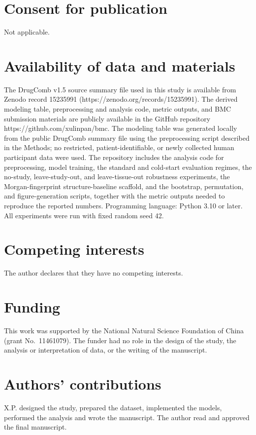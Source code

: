 \documentclass[11pt]{article}
\begin{document}
\section*{Consent for publication}
Not applicable.

\section*{Availability of data and materials}
The DrugComb v1.5 source summary file used in this study is available from Zenodo record 15235991 (https://zenodo.org/records/15235991). The derived modeling table, preprocessing and analysis code, metric outputs, and BMC submission materials are publicly available in the GitHub repository https://github.com/xulinpan/bmc. The modeling table was generated locally from the public DrugComb summary file using the preprocessing script described in the Methods; no restricted, patient-identifiable, or newly collected human participant data were used. The repository includes the analysis code for preprocessing, model training, the standard and cold-start evaluation regimes, the no-study, leave-study-out, and leave-tissue-out robustness experiments, the Morgan-fingerprint structure-baseline scaffold, and the bootstrap, permutation, and figure-generation scripts, together with the metric outputs needed to reproduce the reported numbers. Programming language: Python 3.10 or later. All experiments were run with fixed random seed 42.

\section*{Competing interests}
The author declares that they have no competing interests.

\section*{Funding}
This work was supported by the National Natural Science Foundation of China (grant No.~11461079). The
funder had no role in the design of the study, the analysis or interpretation of data, or the writing
of the manuscript.

\section*{Authors' contributions}
X.P. designed the study, prepared the dataset, implemented the models, performed the analysis and wrote
the manuscript. The author read and approved the final manuscript.
\end{document}
